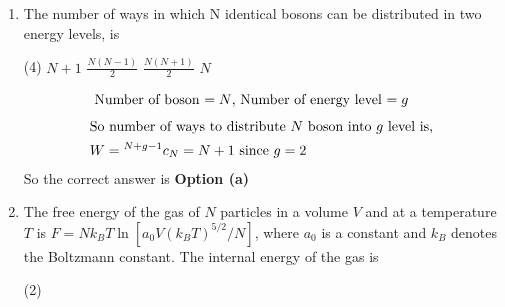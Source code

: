 \begin{enumerate}
	\begin{tasks}(4)
		\task[\textbf{a.}] $\varepsilon^{\frac{s}{d}-1}$
		\task[\textbf{b.}] $\varepsilon^{\frac{d}{s}-1}$
		\task[\textbf{c.}] $\varepsilon^{\frac{d}{s}+1}$
		\task[\textbf{d.}] $\varepsilon^{\frac{s}{d}+1}$
	\end{tasks}
\begin{answer}
	\begin{align*}
	\text{We can solve this problem with intuition for example $\varepsilon=A k^{2}$}\\
	\text{Density of state in 3-dimensional $N(\varepsilon) \propto \varepsilon^{\frac{1}{2}}=\varepsilon^{\frac{3}{2}-1}$}\\
	\text{Density of state in 2-dimensional $N(\varepsilon) \propto \varepsilon^{0}=\varepsilon^{\frac{2}{2}-1}$}\\
	\text{Density of state in 1-dimensional $N(\varepsilon) \propto \varepsilon^{\frac{-1}{2}}=\varepsilon^{\frac{1}{2}-1}$}\\
	\text{	Density of state in d-dimensional, where $\varepsilon=A k^{s} \Rightarrow \mathrm{N}(\varepsilon) \propto \varepsilon^{\frac{\mathrm{d}}{5}-1}$}
	\end{align*}
	So the correct answer is \textbf{Option (b)}
\end{answer}
	\item The number of ways in which $\mathrm{N}$ identical bosons can be distributed in two energy levels, is
	{}
	\begin{tasks}(4)
		\task[\textbf{a.}] $N+1$
		\task[\textbf{b.}] $\frac{N(N-1)}{2}$
		\task[\textbf{c.}] $\frac{N(N+1)}{2}$
		\task[\textbf{d.}] $N$
	\end{tasks}
\begin{answer}
	\begin{align*}
	\intertext{	Number of boson $=N$, Number of energy level $=g$}
	\intertext{So number of ways to distribute $N$ boson into $g$ level is, }
	W&={ }^{N+g-1} c_{N}=N+1\text{ since }g=2
	\end{align*}
	So the correct answer is \textbf{Option (a)}
\end{answer}
	\item The free energy of the gas of $N$ particles in a volume $V$ and at a temperature $T$ is $F=N k_{B} T \ln \left[a_{0} V\left(k_{B} T\right)^{5 / 2} / N\right]$, where $a_{0}$ is a constant and $k_{B}$ denotes the Boltzmann constant. The internal energy of the gas is
	{}
	\begin{tasks}(2)

\end{tasks}
\end{enumerate}
